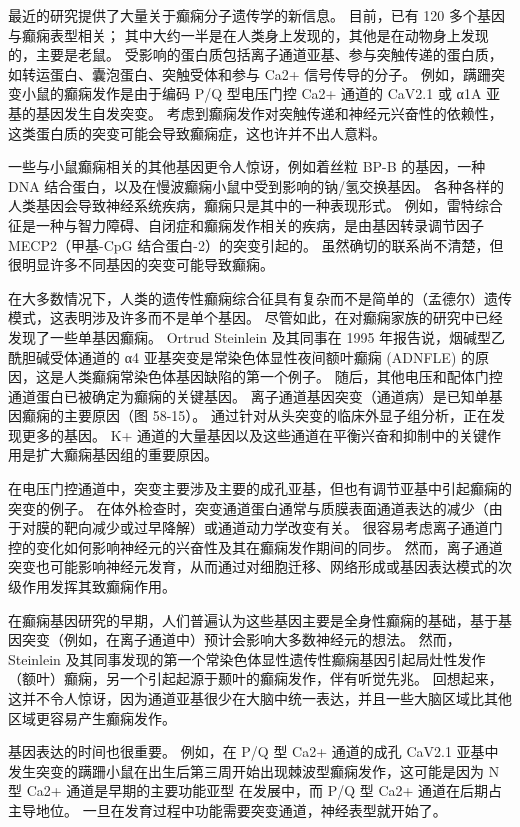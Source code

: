 最近的研究提供了大量关于癫痫分子遗传学的新信息。 目前，已有 120 多个基因与癫痫表型相关； 其中大约一半是在人类身上发现的，其他是在动物身上发现的，主要是老鼠。 受影响的蛋白质包括离子通道亚基、参与突触传递的蛋白质，如转运蛋白、囊泡蛋白、突触受体和参与 Ca2+ 信号传导的分子。 例如，蹒跚突变小鼠的癫痫发作是由于编码 P/Q 型电压门控 Ca2+ 通道的 CaV2.1 或 α1A 亚基的基因发生自发突变。 考虑到癫痫发作对突触传递和神经元兴奋性的依赖性，这类蛋白质的突变可能会导致癫痫症，这也许并不出人意料。

一些与小鼠癫痫相关的其他基因更令人惊讶，例如着丝粒 BP-B 的基因，一种 DNA 结合蛋白，以及在慢波癫痫小鼠中受到影响的钠/氢交换基因。 各种各样的人类基因会导致神经系统疾病，癫痫只是其中的一种表现形式。 例如，雷特综合征是一种与智力障碍、自闭症和癫痫发作相关的疾病，是由基因转录调节因子 MECP2（甲基-CpG 结合蛋白-2）的突变引起的。 虽然确切的联系尚不清楚，但很明显许多不同基因的突变可能导致癫痫。

在大多数情况下，人类的遗传性癫痫综合征具有复杂而不是简单的（孟德尔）遗传模式，这表明涉及许多而不是单个基因。 尽管如此，在对癫痫家族的研究中已经发现了一些单基因癫痫。 Ortrud Steinlein 及其同事在 1995 年报告说，烟碱型乙酰胆碱受体通道的 α4 亚基突变是常染色体显性夜间额叶癫痫 (ADNFLE) 的原因，这是人类癫痫常染色体基因缺陷的第一个例子。 随后，其他电压和配体门控通道蛋白已被确定为癫痫的关键基因。 离子通道基因突变（通道病）是已知单基因癫痫的主要原因（图 58-15）。 通过针对从头突变的临床外显子组分析，正在发现更多的基因。 K+ 通道的大量基因以及这些通道在平衡兴奋和抑制中的关键作用是扩大癫痫基因组的重要原因。

在电压门控通道中，突变主要涉及主要的成孔亚基，但也有调节亚基中引起癫痫的突变的例子。 在体外检查时，突变通道蛋白通常与质膜表面通道表达的减少（由于对膜的靶向减少或过早降解）或通道动力学改变有关。 很容易考虑离子通道门控的变化如何影响神经元的兴奋性及其在癫痫发作期间的同步。 然而，离子通道突变也可能影响神经元发育，从而通过对细胞迁移、网络形成或基因表达模式的次级作用发挥其致癫痫作用。

在癫痫基因研究的早期，人们普遍认为这些基因主要是全身性癫痫的基础，基于基因突变（例如，在离子通道中）预计会影响大多数神经元的想法。 然而，Steinlein 及其同事发现的第一个常染色体显性遗传性癫痫基因引起局灶性发作（额叶）癫痫，另一个引起起源于颞叶的癫痫发作，伴有听觉先兆。 回想起来，这并不令人惊讶，因为通道亚基很少在大脑中统一表达，并且一些大脑区域比其他区域更容易产生癫痫发作。

基因表达的时间也很重要。 例如，在 P/Q 型 Ca2+ 通道的成孔 CaV2.1 亚基中发生突变的蹒跚小鼠在出生后第三周开始出现棘波型癫痫发作，这可能是因为 N 型 Ca2+ 通道是早期的主要功能亚型 在发展中，而 P/Q 型 Ca2+ 通道在后期占主导地位。 一旦在发育过程中功能需要突变通道，神经表型就开始了。

